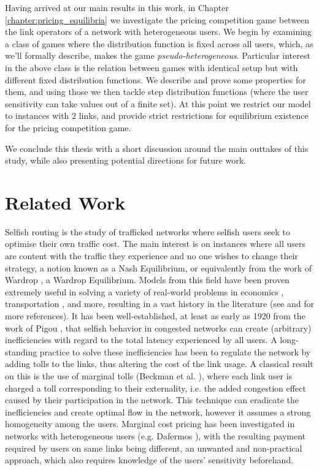 \documentclass[10pt,a4paper]{book}
\theoremstyle{definition}
\theoremstyle{comment}
\begin{document}
Having arrived at our main results in this work, in Chapter \ref{chapter:pricing_equilibria} we investigate the pricing competition game between the link operators of a network with heterogeneous users.
We begin by examining a class of games where the distribution function is fixed across all users, which, as we'll formally describe, makes the game \textit{pseudo-heterogeneous}.
Particular interest in the above class is the relation between games with identical setup but with different fixed distribution functions.
We describe and prove some properties for them, and using those we then tackle step distribution functions (where the user sensitivity can take values out of a finite set).
At this point we restrict our model to instances with $2$ links, and provide strict restrictions for equilibrium existence for the pricing competition game.

We conclude this thesis with a short discussion around the main outtakes of this study, while also presenting potential directions for future work.


\section{Related Work}
\label{section:related_work}

Selfish routing is the study of trafficked networks where selfish users seek to optimise their own traffic cost.
The main interest is on instances where all users are content with the traffic they experience and no one wishes to change their strategy, a notion known as a Nash Equilibrium, or equivalently from the work of Wardrop \cite{wardrop_theoretical_1952}, a Wardrop Equilibrium.
Models from this field have been proven extremely useful in solving a variety of real-world problems in economics \cite{pigou1920economics}, transportation \cite{beckmann1956studies}, \cite{wardrop_theoretical_1952} and more, resulting in a vast history in the literature (see \cite{roughgarden2002sr} and \cite{roughgarden2005slpoa} for more references).
It has been well-established, at least as early as 1920 from the work of Pigou \cite{pigou1920economics}, that selfish behavior in congested networks can create (arbitrary) inefficiencies with regard to the total latency experienced by all users.
A long-standing practice to solve these inefficiencies has been to regulate the network by adding tolls to the links, thus altering the cost of the link usage.
A classical result on this is the use of marginal tolls (Beckman et al. \cite{beckmann1956studies}), where each link user is charged a toll corresponding to their externality, i.e. the added congestion effect caused by their participation in the network.
This technique can eradicate the inefficiencies and create optimal flow in the network, however it assumes a strong homogeneity among the users.
Marginal cost pricing has been investigated in networks with heterogeneous users (e.g. Dafermos \cite{dafermos1973toll}), with the resulting payment required by users on same links being different, an unwanted and non-practical approach, which also requires knowledge of the users' sensitivity beforehand.
\end{document}
